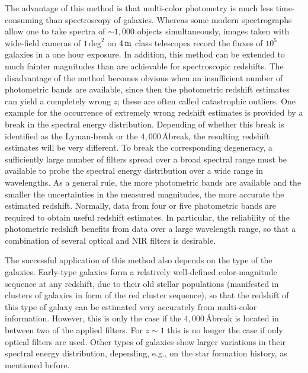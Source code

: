 \documentclass[a4paper,11pt]{article}
\begin{document}
{\noindent}The advantage of this method is that multi-color photometry is much less time-consuming than spectroscopy of galaxies. Whereas some modern spectrographs allow one to take spectra of $\sim1,000$ objects simultaneously, images taken with wide-field cameras of $1\,\mathrm{deg}^2$ on $4\,{\rm m}$ class telescopes record the fluxes of $10^5$ galaxies in a one hour exposure. In addition, this method can be extended to much fainter magnitudes than are achievable for spectroscopic redshifts. The disadvantage of the method becomes obvious when an insufficient number of photometric bands are available, since then the photometric redshift estimates can yield a completely wrong $z$; these are often called catastrophic outliers. One example for the occurrence of extremely wrong redshift estimates is provided by a break in the spectral energy distribution. Depending of whether this break is identified as the Lyman-break or the $4,000\,$\AA break, the resulting redshift estimates will be very different. To break the corresponding degeneracy, a sufficiently large number of filters spread over a broad spectral range must be available to probe the spectral energy distribution over a wide range in wavelengths. As a general rule, the more photometric bands are available and the smaller the uncertainties in the measured magnitudes, the more accurate the estimated redshift. Normally, data from four or five photometric bands are required to obtain useful redshift estimates. In particular, the reliability of the photometric redshift benefits from data over a large wavelength range, so that a combination of several optical and NIR filters is desirable.

{\noindent}The successful application of this method also depends on the type of the galaxies. Early-type galaxies form a relatively well-defined color-magnitude sequence at any redshift, due to their old stellar populations (manifested in clusters of galaxies in form of the red cluster sequence), so that the redshift of this type of galaxy can be estimated very accurately from multi-color information. However, this is only the case if the $4,000\,$\AA break is located in between two of the applied filters. For $z\sim1$ this is no longer the case if only optical filters are used. Other types of galaxies show larger variations in their spectral energy distribution, depending, e.g., on the star formation history, as mentioned before.
\end{document}

